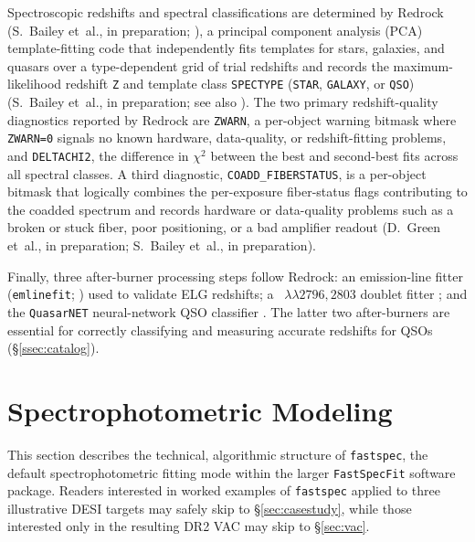 \documentclass[modern,linenumbers]{aastex701}
\newcommand{\fastspecfit}{\texttt{FastSpecFit}}
\newcommand{\fastspec}{\texttt{fastspec}}
\newcommand{\mgiidoublet}{\ion{Mg}{2}~$\lambda\lambda2796,2803$}
\begin{document}
Spectroscopic redshifts and spectral classifications are determined by
Redrock (S.~Bailey et~al., in preparation; \citealt{anand24a}), a
principal component analysis (PCA) template-fitting code that
independently fits templates for stars, galaxies, and quasars over a
type-dependent grid of trial redshifts and records the
maximum-likelihood redshift \texttt{Z} and template class
\texttt{SPECTYPE} (\texttt{STAR}, \texttt{GALAXY}, or \texttt{QSO})
(S.~Bailey et~al., in preparation; see also \citealt{guy23a,
  anand24a}). The two primary redshift-quality diagnostics reported by
Redrock are \texttt{ZWARN}, a per-object warning bitmask where
\texttt{ZWARN=0} signals no known hardware, data-quality, or
redshift-fitting problems, and \texttt{DELTACHI2}, the difference in
$\chi^2$ between the best and second-best fits across all spectral
classes. A third diagnostic, \texttt{COADD\_FIBERSTATUS}, is a
per-object bitmask that logically combines the per-exposure
fiber-status flags contributing to the coadded spectrum and records
hardware or data-quality problems such as a broken or stuck fiber,
poor positioning, or a bad amplifier readout (D.~Green et~al., in
preparation; S.~Bailey et~al., in preparation).

Finally, three after-burner processing steps follow Redrock: an
emission-line fitter (\texttt{emlinefit}; \citealt{raichoor23a,
  desi-collaboration24d}) used to validate ELG redshifts; a
\mgiidoublet{} doublet fitter \citep{chaussidon23a}; and the
\texttt{QuasarNET} neural-network QSO classifier \citep{busca18a,
  green25a}. The latter two after-burners are essential for correctly
classifying and measuring accurate redshifts for QSOs
(\S\ref{ssec:catalog}).

\section{Spectrophotometric Modeling}
\label{sec:modeling}

This section describes the technical, algorithmic structure of
\fastspec, the default spectrophotometric fitting mode within the
larger \fastspecfit{} software package. Readers interested in worked
examples of \fastspec{} applied to three illustrative DESI targets may
safely skip to \S\ref{sec:casestudy}, while those interested only in
the resulting DR2 VAC may skip to \S\ref{sec:vac}.
\end{document}
